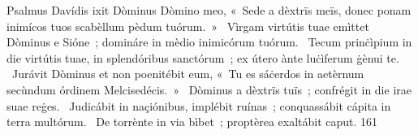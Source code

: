 { Psalmus Davídis}
{%
ixit Dòminus Dòmino meo, «~Sede a dèxtrïs meïs, donec ponam inimícos tuos scabèllum pèdum tuórum.~»
~Vìrgam virtútis tuae emìttet Dòminus e Sióne~; domináre in mèdio inimicórum tuórum. 
~Tecum prinċìpium in die virtútis tuae, in splendóribus sanctórum~; ex útero ànte luċìferum ġènui te. 
~Jurávit Dòminus et non poenitébit eum, «~Tu es sáċerdos in aetèrnum secùndum órdinem Melcisedécis.~»
~Dòminus a dèxtrïs tuïs~; confrégit in die irae suae reġes. 
~Judicábit in naçiónibus, implébit ruínas~; conquassábit cápita in terra multórum. 
~De torrènte in via bìbet~; proptèrea exaltábit caput. 
}
{16}{1}
